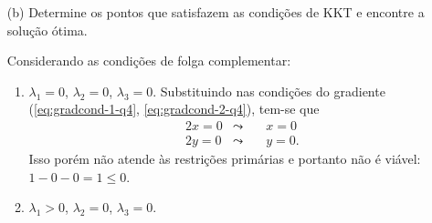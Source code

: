 \documentclass[11pt,a4paper]{article}
\begin{document}
\begin{enumerate}
\begin{itemize}
            \item[(b)] Determine os pontos que satisfazem as condições de KKT e encontre a solução ótima.
            
            Considerando as condições de folga complementar:
            \begin{enumerate}[label=\roman*]
                \item $\lambda_1 = 0$, $\lambda_2 = 0$, $\lambda_3 = 0$.
                Substituindo nas condições do gradiente (\ref{eq:gradcond-1-q4}, \ref{eq:gradcond-2-q4}), tem-se que
                \begin{equation*}
                    \begin{aligned}
                        & 2x = 0 & \leadsto \quad & x = 0\\
                        & 2y = 0 & \leadsto \quad & y = 0.
                    \end{aligned}
                \end{equation*}
                Isso porém não atende às restrições primárias e portanto não é viável: $1 - 0 - 0 = 1 \leq 0$.
                \item $\lambda_1 > 0$, $\lambda_2 = 0$, $\lambda_3 = 0$.
                

\end{enumerate}
\end{itemize}
\end{enumerate}
\end{document}
